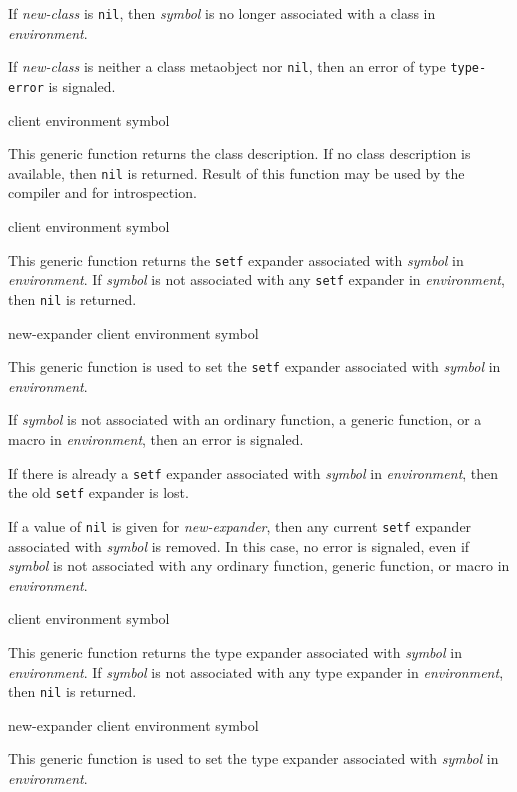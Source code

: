 If \textit{new-class} is \texttt{nil}, then \textit{symbol} is no
longer associated with a class in \textit{environment}.

If \textit{new-class} is neither a class metaobject nor \texttt{nil},
then an error of type \texttt{type-error} is signaled.

 {client environment symbol}

This generic function returns the class description. If no class description
is available, then \texttt{nil} is returned. Result of this function may be
used by the compiler and for introspection.

 {client environment symbol}

This generic function returns the \texttt{setf} expander associated
with \textit{symbol} in \textit{environment}.  If \textit{symbol} is
not associated with any \texttt{setf} expander in
\textit{environment}, then \texttt{nil} is returned.

 {new-expander client environment symbol}

This generic function is used to set the \texttt{setf} expander
associated with \textit{symbol} in \textit{environment}.

If \textit{symbol} is not associated with an ordinary function, a
generic function, or a macro in \textit{environment}, then an error is
signaled.

If there is already a \texttt{setf} expander associated with
\textit{symbol} in \textit{environment}, then the old \texttt{setf}
expander is lost.

If a value of \texttt{nil} is given for \textit{new-expander}, then
any current \texttt{setf} expander associated with \textit{symbol} is
removed.  In this case, no error is signaled, even if \textit{symbol}
is not associated with any ordinary function, generic function, or
macro in \textit{environment}.

 {client environment symbol}

This generic function returns the type expander associated with
\textit{symbol} in \textit{environment}.  If \textit{symbol} is not
associated with any type expander in \textit{environment}, then
\texttt{nil} is returned.

 {new-expander client environment symbol}

This generic function is used to set the type expander associated with
\textit{symbol} in \textit{environment}.

